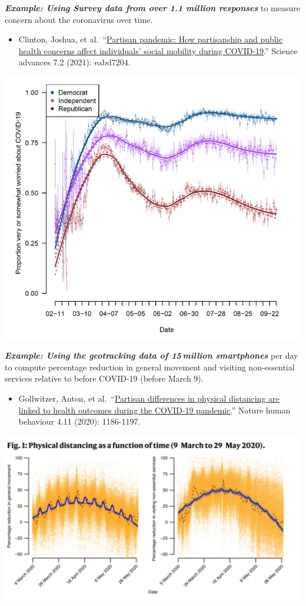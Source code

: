 \documentclass[
  letterpaper,
  DIV=11,
  numbers=noendperiod]{scrreprt}
\providecommand{\tightlist}{%
  \setlength{\itemsep}{0pt}\setlength{\parskip}{0pt}}\usepackage{longtable,booktabs,array}
\begin{document}
\textbf{\emph{Example: Using Survey data from over 1.1 million
responses}} to measure concern about the coronavirus over time.

\begin{itemize}
\tightlist
\item
  Clinton, Joshua, et
  al.~``\href{https://www.science.org/doi/10.1126/sciadv.abd7204}{Partisan
  pandemic: How partisanship and public health concerns affect
  individuals' social mobility during COVID-19}.'' Science advances 7.2
  (2021): eabd7204.
\end{itemize}

\includegraphics{images/covidsurvey.png}

\textbf{\emph{Example: Using the geotracking data of 15 million
smartphones}} per day to compute percentage reduction in general
movement and visiting non-essential services relative to before COVID-19
(before March 9).

\begin{itemize}
\tightlist
\item
  Gollwitzer, Anton, et
  al.~``\href{https://www.nature.com/articles/s41562-020-00977-7}{Partisan
  differences in physical distancing are linked to health outcomes
  during the COVID-19 pandemic}.'' Nature human behaviour 4.11 (2020):
  1186-1197.
\end{itemize}

\includegraphics{images/covidphone.png}
\end{document}
